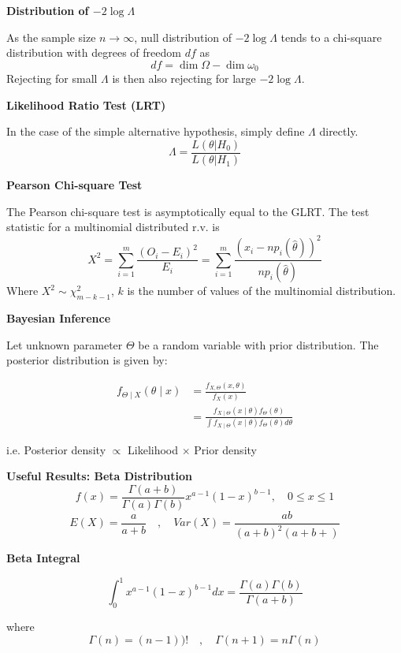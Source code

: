 \documentclass[a4paper]{article}
\newcommand{\subheading}[1]{{\scriptsize\textbf{#1}}}
\begin{document}
\begin{multicols*}{4}
\subheading{Distribution of $-2\log\Lambda$}

  As the sample size $n \rightarrow \infty$, null distribution of $-2\log
  \Lambda$ tends to a chi-square distribution with degrees of freedom $df$ as
  $$df = \dim \Omega - \dim \omega_0$$
  Rejecting for small $\Lambda$ is then also
  rejecting for large $-2\log\Lambda$. 
\smallskip

\subheading{Likelihood Ratio Test (LRT)}

  In the case of the simple alternative hypothesis, simply define $\Lambda$
  directly.
  $$\Lambda = \frac{
    L(\theta | H_0)
  }{
    L(\theta | H_1)
  }$$


\subheading{Pearson Chi-square Test}

  The Pearson chi-square test is asymptotically equal to the GLRT. The test
  statistic for a multinomial distributed r.v. is
  $$X^2 = \sum^m_{i=1}\frac{(O_i - E_i)^2}{E_i}
    = \sum^m_{i=1} \frac{(x_i - np_i(\hat{\theta}))^2}{np_i(\hat{\theta})}$$
  Where $X^2 \sim \chi^2_{m-k-1}$, $k$ is the number of values of the
  multinomial distribution.

\smallskip
\hline
\smallskip

\subheading{Bayesian Inference}

Let unknown parameter $\Theta$ be a random variable with prior distribution. The posterior distribution is given by:

$$\begin{aligned}f_{\Theta \mid X}(\theta \mid x) &=\frac{f_{X, \Theta}(x, \theta)}{f_X(x)} \\ &=\frac{f_{X \mid \Theta}(x \mid \theta) f_{\Theta}(\theta)}{\int f_{X \mid \Theta}(x \mid \theta) f_{\Theta}(\theta) d \theta} \end{aligned}$$

i.e. Posterior density $\propto$ Likelihood $\times$ Prior density

\smallskip

\subheading{Useful Results: Beta Distribution}
$$
f(x) =\frac{\Gamma(a+b)}{\Gamma(a) \Gamma(b)} x^{a-1}(1-x)^{b-1}, \quad 0 \leq x \leq 1
$$
$$
E(X) = \frac{a}{a+b} \quad,\quad Var(X) = \frac{ab}{(a+b)^2(a+b+)}
$$

\subheading{Beta Integral}

$$\int_0^1 x^{a-1}(1-x)^{b-1}dx = \frac{\Gamma(a)\Gamma(b)}{\Gamma(a+b)}$$

where 
$$\Gamma(n) = (n-1))! \quad,\quad \Gamma(n+1) = n\Gamma(n)$$

\end{multicols*}
\end{document}

